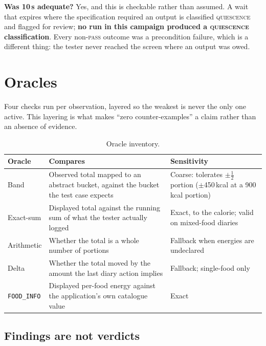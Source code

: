\documentclass[11pt,a4paper]{article}
\newcommand{\gate}[1]{\texttt{\small #1}}
\begin{document}
\noindent\textbf{Was 10\,s adequate?} Yes, and this is checkable rather than
assumed. A wait that expires where the specification required an output is
classified \textsc{quiescence} and flagged for review; \textbf{no run in this
campaign produced a \textsc{quiescence} classification}. Every non-\textsc{pass}
outcome was a precondition failure, which is a different thing: the tester never
reached the screen where an output was owed.

\section{Oracles}

Four checks run per observation, layered so the weakest is never the only one
active. This layering is what makes ``zero counter-examples'' a claim rather than
an absence of evidence.

\begin{table}[h]
\centering\footnotesize
\caption{Oracle inventory.}
\label{tab:oracles}
\begin{tabular}{@{}lp{6.4cm}p{5.4cm}@{}}
\toprule
\textbf{Oracle} & \textbf{Compares} & \textbf{Sensitivity} \\
\midrule
Band & Observed total mapped to an abstract bucket, against the bucket the test
case expects & Coarse: tolerates $\pm\tfrac{1}{2}$ portion ($\pm$450\,kcal at a
900\,kcal portion) \\
\addlinespace
Exact-sum & Displayed total against the running sum of what the tester actually
logged & Exact, to the calorie; valid on mixed-food diaries \\
\addlinespace
Arithmetic & Whether the total is a whole number of portions & Fallback when
energies are undeclared \\
\addlinespace
Delta & Whether the total moved by the amount the last diary action implies &
Fallback; single-food only \\
\addlinespace
\gate{FOOD\_INFO} & Displayed per-food energy against the application's own
catalogue value & Exact \\
\bottomrule
\end{tabular}
\end{table}

\subsection{Findings are not verdicts}
\end{document}
